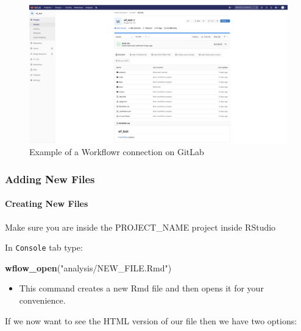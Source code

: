\documentclass[openany]{article}
\newenvironment{Shaded}{\begin{snugshade}}{\end{snugshade}}
\newcommand{\KeywordTok}[1]{\textcolor[rgb]{0.13,0.29,0.53}{\textbf{#1}}}
\newcommand{\NormalTok}[1]{#1}
\newcommand{\StringTok}[1]{\textcolor[rgb]{0.31,0.60,0.02}{#1}}
\providecommand{\tightlist}{%
  \setlength{\itemsep}{0pt}\setlength{\parskip}{0pt}}
\let\oldparagraph\paragraph
\renewcommand{\paragraph}[1]{\oldparagraph{#1}\mbox{}}
\begin{document}
\begin{figure}

{\centering \includegraphics[width=1\linewidth]{images/Workflow_Photos/screen_shot} 

}

\caption{Example of a Workflowr connection on GitLab}\label{fig:a3}
\end{figure}

\hypertarget{adding-new-files}{%
\subsubsection{Adding New Files}\label{adding-new-files}}

\hypertarget{creating-new-files}{%
\paragraph{Creating New Files}\label{creating-new-files}}

Make sure you are inside the PROJECT\_NAME project inside RStudio

In \texttt{Console} tab type:

\begin{Shaded}
\begin{Highlighting}[]
\KeywordTok{wflow_open}\NormalTok{(}\StringTok{"analysis/NEW_FILE.Rmd"}\NormalTok{)}
\end{Highlighting}
\end{Shaded}

\begin{itemize}
\tightlist
\item
  This command creates a new Rmd file and then opens it for your convenience.
\end{itemize}

If we now want to see the HTML version of our file then we have two options:
\end{document}
